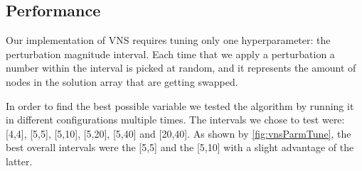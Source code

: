 
\subsection{Performance}

Our implementation of VNS requires tuning only one hyperparameter: the perturbation magnitude interval.
Each time that we apply a perturbation a number within the interval is picked at random, and it represents the amount of nodes in the solution array that are getting swapped.

In order to find the best possible variable we tested the algorithm by running it in different configurations multiple times.
The intervals we chose to test were: [4,4], [5,5], [5,10], [5,20], [5,40] and [20,40].
As shown by \figurename{ \ref{fig:vnsParmTune}}, the best overall intervals were the [5,5] and the [5,10] with a slight advantage of the latter.

